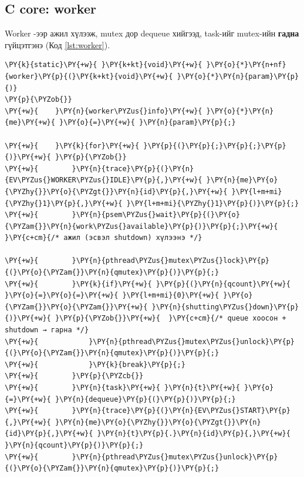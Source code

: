 \documentclass[12pt,a4paper]{article}
\begin{document}
\subsection{C core: worker}

Worker -ээр ажил хүлээж, mutex дор dequeue хийгээд, task-ийг mutex-ийн \textbf{гадна} гүйцэтгэнэ (Код \ref{lst:worker}).

\par\noindent\begin{minipage}{\linewidth}\setlength{\topsep}{1pt}\setlength{\partopsep}{0pt}
\label{lst:worker}
\begin{Verbatim}[commandchars=\\\{\}]
\PY{k}{static}\PY{+w}{ }\PY{k+kt}{void}\PY{+w}{ }\PY{o}{*}\PY{n+nf}{worker}\PY{p}{(}\PY{k+kt}{void}\PY{+w}{ }\PY{o}{*}\PY{n}{param}\PY{p}{)}
\PY{p}{\PYZob{}}
\PY{+w}{    }\PY{n}{worker\PYZus{}info}\PY{+w}{ }\PY{o}{*}\PY{n}{me}\PY{+w}{ }\PY{o}{=}\PY{+w}{ }\PY{n}{param}\PY{p}{;}

\PY{+w}{    }\PY{k}{for}\PY{+w}{ }\PY{p}{(}\PY{p}{;}\PY{p}{;}\PY{p}{)}\PY{+w}{ }\PY{p}{\PYZob{}}
\PY{+w}{        }\PY{n}{trace}\PY{p}{(}\PY{n}{EV\PYZus{}WORKER\PYZus{}IDLE}\PY{p}{,}\PY{+w}{ }\PY{n}{me}\PY{o}{\PYZhy{}}\PY{o}{\PYZgt{}}\PY{n}{id}\PY{p}{,}\PY{+w}{ }\PY{l+m+mi}{\PYZhy{}1}\PY{p}{,}\PY{+w}{ }\PY{l+m+mi}{\PYZhy{}1}\PY{p}{)}\PY{p}{;}
\PY{+w}{        }\PY{n}{psem\PYZus{}wait}\PY{p}{(}\PY{o}{\PYZam{}}\PY{n}{work\PYZus{}available}\PY{p}{)}\PY{p}{;}\PY{+w}{  }\PY{c+cm}{/* ажил (эсвэл shutdown) хүлээнэ */}

\PY{+w}{        }\PY{n}{pthread\PYZus{}mutex\PYZus{}lock}\PY{p}{(}\PY{o}{\PYZam{}}\PY{n}{qmutex}\PY{p}{)}\PY{p}{;}
\PY{+w}{        }\PY{k}{if}\PY{+w}{ }\PY{p}{(}\PY{n}{qcount}\PY{+w}{ }\PY{o}{=}\PY{o}{=}\PY{+w}{ }\PY{l+m+mi}{0}\PY{+w}{ }\PY{o}{\PYZam{}}\PY{o}{\PYZam{}}\PY{+w}{ }\PY{n}{shutting\PYZus{}down}\PY{p}{)}\PY{+w}{ }\PY{p}{\PYZob{}}\PY{+w}{  }\PY{c+cm}{/* queue хоосон + shutdown → гарна */}
\PY{+w}{            }\PY{n}{pthread\PYZus{}mutex\PYZus{}unlock}\PY{p}{(}\PY{o}{\PYZam{}}\PY{n}{qmutex}\PY{p}{)}\PY{p}{;}
\PY{+w}{            }\PY{k}{break}\PY{p}{;}
\PY{+w}{        }\PY{p}{\PYZcb{}}
\PY{+w}{        }\PY{n}{task}\PY{+w}{ }\PY{n}{t}\PY{+w}{ }\PY{o}{=}\PY{+w}{ }\PY{n}{dequeue}\PY{p}{(}\PY{p}{)}\PY{p}{;}
\PY{+w}{        }\PY{n}{trace}\PY{p}{(}\PY{n}{EV\PYZus{}START}\PY{p}{,}\PY{+w}{ }\PY{n}{me}\PY{o}{\PYZhy{}}\PY{o}{\PYZgt{}}\PY{n}{id}\PY{p}{,}\PY{+w}{ }\PY{n}{t}\PY{p}{.}\PY{n}{id}\PY{p}{,}\PY{+w}{ }\PY{n}{qcount}\PY{p}{)}\PY{p}{;}
\PY{+w}{        }\PY{n}{pthread\PYZus{}mutex\PYZus{}unlock}\PY{p}{(}\PY{o}{\PYZam{}}\PY{n}{qmutex}\PY{p}{)}\PY{p}{;}


\end{Verbatim}
\end{minipage}
\end{document}
